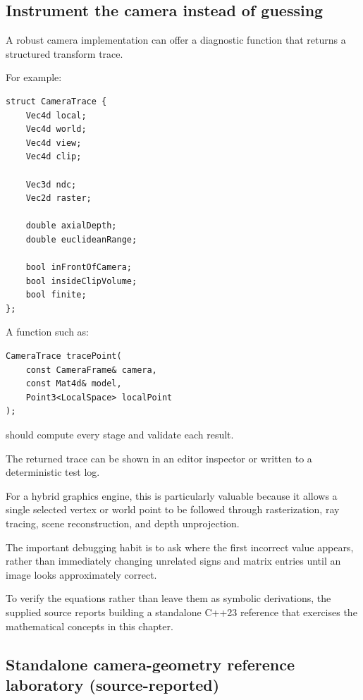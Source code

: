 \subsection{Instrument the camera instead of guessing}\label{02-foundations-ii-ch037-instrument-the-camera-instead-of-guessing}

A robust camera implementation can offer a diagnostic function that returns a structured transform trace.

For example:

\begin{verbatim}
struct CameraTrace {
    Vec4d local;
    Vec4d world;
    Vec4d view;
    Vec4d clip;

    Vec3d ndc;
    Vec2d raster;

    double axialDepth;
    double euclideanRange;

    bool inFrontOfCamera;
    bool insideClipVolume;
    bool finite;
};
\end{verbatim}

A function such as:

\begin{verbatim}
CameraTrace tracePoint(
    const CameraFrame& camera,
    const Mat4d& model,
    Point3<LocalSpace> localPoint
);
\end{verbatim}

should compute every stage and validate each result.

The returned trace can be shown in an editor inspector or written to a deterministic test log.

For a hybrid graphics engine, this is particularly valuable because it allows a single selected vertex or world point to be followed through rasterization, ray tracing, scene reconstruction, and depth unprojection.

The important debugging habit is to ask where the first incorrect value appears, rather than immediately changing unrelated signs and matrix entries until an image looks approximately correct.

To verify the equations rather than leave them as symbolic derivations, the supplied source reports building a standalone C++23 reference that exercises the mathematical concepts in this chapter.

\subsection{Standalone camera-geometry reference laboratory (source-reported)}\label{02-foundations-ii-ch037-standalone-camera-geometry-reference-laboratory-source-reported}

